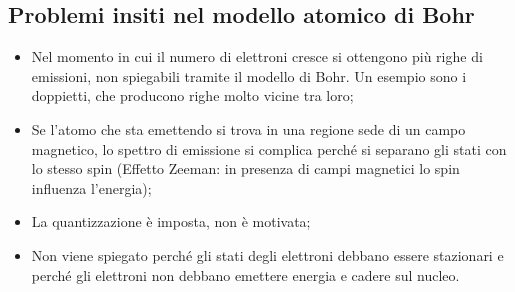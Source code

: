 \subsection{Problemi insiti nel modello atomico di Bohr}
\begin{itemize}
  \item Nel momento in cui il numero di elettroni cresce si ottengono più righe di emissioni, non spiegabili tramite il modello di Bohr. Un esempio sono i doppietti, che producono righe molto vicine tra loro;
  \item Se l'atomo che sta emettendo si trova in una regione sede di un campo magnetico, lo spettro di emissione si complica perché si separano gli stati con lo stesso spin
  (Effetto Zeeman: in presenza di campi magnetici lo spin influenza l'energia);
  \item La quantizzazione è imposta, non è motivata;
  \item Non viene spiegato perché gli stati degli elettroni debbano essere stazionari e perché gli elettroni non debbano emettere energia e cadere sul nucleo.
\end{itemize}